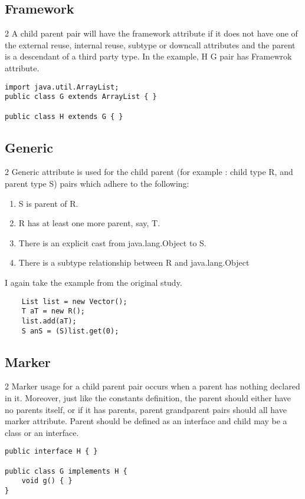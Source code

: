 \documentclass{uvamscse}
\begin{document}
\subsection{Framework}
\begin{multicols} {2}
A child parent pair will have the framework attribute if it does not have one of the external reuse, internal reuse, subtype or downcall attributes and the parent is a descendant of a third party type. In the example, H G pair has Framewrok attribute.
\columnbreak
\begin{verbatim}
import java.util.ArrayList;
public class G extends ArrayList { }
   
public class H extends G { }
\end{verbatim}
\end{multicols}

\subsection{Generic}
\begin{multicols} {2}
Generic attribute is used for the child parent (for example : child type R, and parent type S) pairs which adhere to the following:
\begin{enumerate}
  \item S is parent of R.
  \item R has at least one more parent, say, T.
  \item There is an explicit cast from java.lang.Object to S. 
  \item There is a subtype relationship between R and java.lang.Object
\end{enumerate}
I again take the example from the original study.
\columnbreak
\begin{verbatim}
    List list = new Vector();
    T aT = new R();
    list.add(aT);
    S anS = (S)list.get(0);
\end{verbatim}
\end{multicols}


\subsection{Marker}
\begin{multicols} {2}
Marker usage for a child parent pair occurs when a parent has nothing declared in it. Moreover, just like the constants definition, the parent should either have no parents itself, or if it has parents, parent grandparent pairs should all have marker attribute. Parent should be defined as an interface and child may be a class or an interface. 
\columnbreak
\begin{verbatim}
public interface H { }
   
public class G implements H {
    void g() { }
}
\end{verbatim}
\end{multicols}
\end{document}
